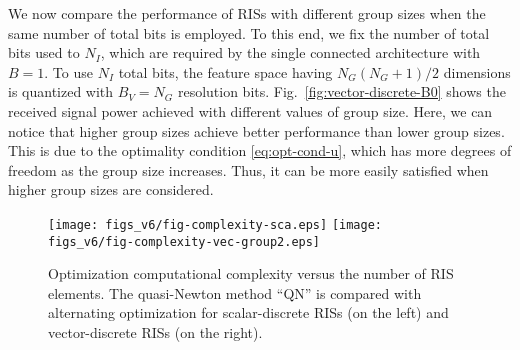 \documentclass[twocolumn,10pt]{IEEEtran}
\begin{document}
We now compare the performance of RISs with different group sizes when the same number of total bits is employed.
To this end, we fix the number of total bits used to $N_{I}$, which are required by the single connected architecture with $B=1$.
To use $N_{I}$ total bits, the feature space having $N_{G}\left(N_{G}+1\right)/2$ dimensions is quantized with $B_{V}=N_{G}$ resolution bits.
Fig.~\ref{fig:vector-discrete-B0} shows the received signal power achieved with different values of group size.
Here, we can notice that higher group sizes achieve better performance than lower group sizes.
This is due to the optimality condition \eqref{eq:opt-cond-u}, which has more degrees of freedom as the group size increases.
Thus, it can be more easily satisfied when higher group sizes are considered.

\begin{figure*}[t]
    \centering
    \texttt{[image: figs\_v6/fig-complexity-sca.eps]}
    \texttt{[image: figs\_v6/fig-complexity-vec-group2.eps]}
    \caption{Optimization computational complexity versus the number of RIS elements. The quasi-Newton method ``QN'' is compared with alternating optimization for scalar-discrete RISs (on the left) and vector-discrete RISs (on the right).}
    \label{fig:complexity}
\end{figure*}
\end{document}
